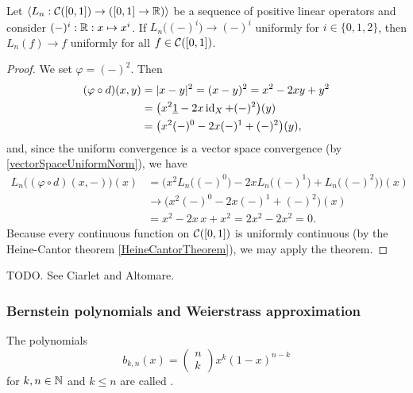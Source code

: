 \begin{corollary} \label{BohmanKorovkin}
Let $\seq{L_n: \cont(\interval{0,1})\to (\interval{0,1}\to \R)}$ be a sequence of positive linear operators and consider $(-)^i: \interval[0,1] \to \R: x\mapsto x^i$. If $L_n\big((-)^i\big) \to (-)^i$ uniformly for $i\in\{0,1,2\}$, then $L_n(f) \to f$ uniformly for all $f\in\cont(\interval{0,1})$.
\end{corollary}
\begin{proof}
We set $\varphi = (-)^2$. Then
\begin{align*}
(\varphi\circ d)(x,y) &= |x-y|^2 = (x-y)^2 = x^2 -2xy +y^2 \\
&= \big(x^2\underline{1} - 2x\operatorname{id}_X + (-)^2\big)(y) \\
&= \big(x^2(-)^0 - 2x(-)^1 + (-)^2\big)(y),
\end{align*}
and, since the uniform convergence is a vector space convergence (by \ref{vectorSpaceUniformNorm}), we have
\begin{align*}
L_n\big((\varphi\circ d)(x,-)\big)(x) &= \Big(x^2L_n\big((-)^0\big) - 2xL_n\big((-)^1\big) + L_n\big((-)^2\big)\Big)(x) \\
&\to \Big(x^2(-)^0 - 2x(-)^1 + (-)^2\Big)(x) \\
&= x^2 - 2x\, x + x^2 = 2x^2 - 2x^2 = 0.
\end{align*}
Because every continuous function on $\cont(\interval{0,1})$ is uniformly continuous (by the Heine-Cantor theorem \ref{HeineCantorTheorem}), we may apply the theorem.
\end{proof}
\begin{corollary}
TODO. See Ciarlet and Altomare.
\end{corollary}

\subsubsection{Bernstein polynomials and Weierstrass approximation}
\begin{definition}
The polynomials
\[ b_{k,n}(x) = \begin{pmatrix}
n \\ k
\end{pmatrix}x^k(1-x)^{n-k} \]
for $k,n\in \mathbb{N}$ and $k\leq n$ are called .
\end{definition}

